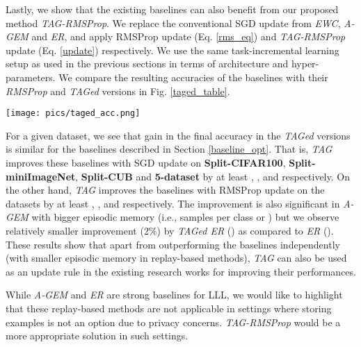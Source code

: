 \documentclass{article} \usepackage{collas2022_conference,times}
\begin{document}
    Lastly, we show that the existing baselines can also benefit from our proposed method \textit{TAG-RMSProp}. We replace the conventional SGD update from \textit{EWC}, \textit{A-GEM} and \textit{ER}, and apply RMSProp update (Eq. \ref{rms_eq}) and \textit{TAG-RMSProp} update (Eq. \ref{update}) respectively. We use the same task-incremental learning setup as used in the previous sections in terms of architecture and hyper-parameters. We compare the resulting accuracies of the baselines with their \textit{RMSProp} and \textit{TAGed} versions in Fig. \ref{taged_table}. 
    
    \begin{figure*}[h!]
        \centering
        \texttt{[image: pics/taged\_acc.png]}
        \caption{Comparing performance for different existing methods with their \textit{RMSProp} and \textit{TAGed} versions on all four datasets in terms of final average test \textbf{Accuracy (\%)} along with \textit{A-GEM} and \textit{ER} for different samples per class () in the episodic memory. The vertical bars with hatches are the performance by \textit{TAGed} versions of the baselines. All results are averaged across 5 runs. All \textit{TAGed} versions results in a similar gain in the accuracy over baselines with both SGD and RMSProp update.}
        \label{taged_table}
    \end{figure*}

    For a given dataset, we see that gain in the final accuracy in the \textit{TAGed} versions is similar for the baselines described in Section \ref{baseline_opt}. That is, \textit{TAG} improves these baselines with SGD update on \textbf{Split-CIFAR100},  \textbf{Split-miniImageNet}, \textbf{Split-CUB} and \textbf{5-dataset} by at least , ,  and  respectively. On the other hand, \textit{TAG} improves the baselines with RMSProp update on the datasets by at least , ,  and  respectively. The improvement is also significant in \textit{A-GEM} with bigger episodic memory (i.e.,  samples per class or ) but we observe relatively smaller improvement (2\%) by \textit{TAGed ER} () as compared to \textit{ER} (). These results show that apart from outperforming the baselines independently (with smaller episodic memory in replay-based methods), \textit{TAG} can also be used as an update rule in the existing research works for improving their performances. 

    While \textit{A-GEM} and \textit{ER} are strong baselines for LLL, we would like to highlight that these replay-based methods are not applicable in settings where storing examples is not an option due to privacy concerns. \textit{TAG-RMSProp} would be a more appropriate solution in such settings.
    
\end{document}
